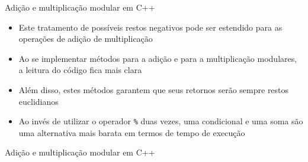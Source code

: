 \begin{frame}[fragile]{Adição e multiplicação modular em C++}

    \begin{itemize}
        \item Este tratamento de possíveis restos negativos pode ser estendido para as operações
            de adição de multiplicação

        \item Ao se implementar métodos para a adição e para a multiplicação modulares, a leitura
            do código fica mais clara

        \item Além disso, estes métodos garantem que seus retornos serão sempre restos 
            euclidianos

        \item Ao invés de utilizar o operador \texttt{\%} duas vezes, uma condicional e uma
            soma são uma alternativa mais barata em termos de tempo de execução
    \end{itemize}

\end{frame}

\begin{frame}[fragile]{Adição e multiplicação modular em C++}
\end{frame}
